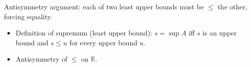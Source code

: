 \begin{remark*}
Antisymmetry argument: each of two least upper bounds must be $\le$ the
other, forcing equality.
\end{remark*}

\begin{remark*}[Dependencies]
\begin{itemize}
  \item Definition of supremum (least upper bound): $s = \sup A$ iff $s$
        is an upper bound and $s \le u$ for every upper bound $u$.
  \item Antisymmetry of $\le$ on $\mathbb{R}$.
\end{itemize}
\end{remark*}

